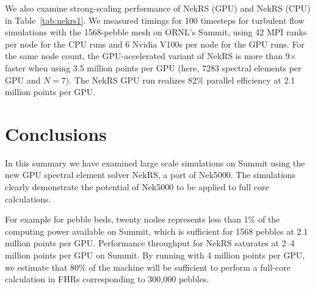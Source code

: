 \documentclass{anstrans}
\begin{document}
\medskip
We also examine strong-scaling performance of NekRS (GPU) and NekRS
(CPU) in Table~\ref{tab:nekrs1}. We measured timings for 100 timesteps for
turbulent flow simulations with the 1568-pebble mesh on ORNL's Summit, using 42
MPI ranks per node for the CPU runs and 6 Nvidia V100s per node for the GPU
runs. For the same node count, the GPU-accelerated variant of NekRS is more
than 9$\times$ faster when using 3.5 million points per GPU (here, 7283
spectral elements per GPU and $N=7$). The NekRS GPU run realizes 82\%
parallel efficiency at 2.1 million points per GPU.

\begin{table}
 \caption{NekRS GPU/CPU strong-scale timings (seconds per step) for 100 steps
of turbulent flow simulations with $Re=10000$ for 1568-Pebble case using total
number of grid points $n=179,864,398$ ($E=524,386$ and $N=7$).}
 \label{tab:nekrs1}
\end{table}

\section{Conclusions}

In this summary we have examined large scale simulations on Summit using the
new GPU spectral element solver NekRS, a port of Nek5000. The simulations
clearly demonstrate the potential of Nek5000 to be applied to full core
calculations.

\medskip
For example for pebble beds, twenty nodes represents less than 1\% of the
computing power available on Summit, which is sufficient for 1568 pebbles at
2.1 million points per GPU. Performance throughput for NekRS saturates at 2--4
million points per GPU on Summit. By running with 4 million points per GPU, we
estimate that 80\% of the machine will be sufficient to perform a full-core
calculation in FHRs corresponding to 300,000 pebbles.



\end{document}
